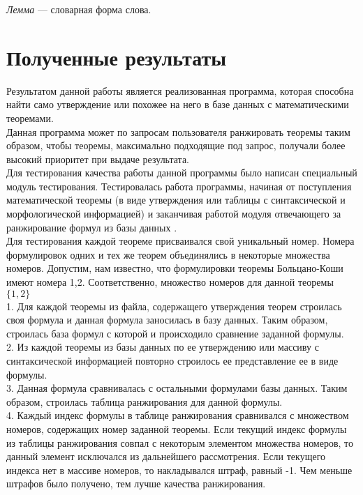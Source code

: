 \documentclass[12pt]{article}
\begin{document}
\textit{Лемма} --- словарная форма слова.\\

\newpage
\section{Полученные результаты}
Результатом данной работы является реализованная программа, которая способна найти само утверждение или похожее на него в базе данных с математическими теоремами.\\

Данная программа может по запросам пользователя ранжировать теоремы таким образом, чтобы теоремы, максимально подходящие под запрос, получали более высокий приоритет при выдаче результата. \\

Для тестирования качества работы данной программы было написан специальный модуль тестирования. Тестировалась работа программы, начиная от поступления математической теоремы (в виде утверждения или таблицы с синтаксической и морфологической информацией) и заканчивая работой модуля отвечающего за ранжирование формул из базы данных . \\

Для тестирования каждой теореме присваивался свой уникальный номер. Номера формулировок одних и тех же теорем объединялись в некоторые множества номеров. Допустим, нам известно, что формулировки теоремы Больцано-Коши имеют номера 1,2. Соответственно, множество номеров для данной теоремы $\{1,2\}$\\

1. Для каждой теоремы из файла, содержащего утверждения теорем строилась своя формула и данная формула заносилась в базу данных. Таким образом, строилась база формул с которой и происходило сравнение заданной формулы.\\

2. Из каждой теоремы из базы данных по ее утверждению или массиву с синтаксической информацией повторно строилось ее представление ее в виде формулы.\\

3. Данная формула сравнивалась с остальными формулами базы данных. Таким образом, строилась таблица ранжирования для данной формулы.\\

4. Каждый индекс формулы в таблице ранжирования сравнивался с множеством номеров, содержащих номер заданной теоремы. Если текущий индекс формулы из таблицы ранжирования совпал с некоторым элементом множества номеров, то данный элемент исключался из дальнейшего рассмотрения. Если текущего индекса нет в массиве номеров, то накладывался штраф, равный -1. Чем меньше штрафов было получено, тем лучше качества ранжирования.\\
\end{document}
